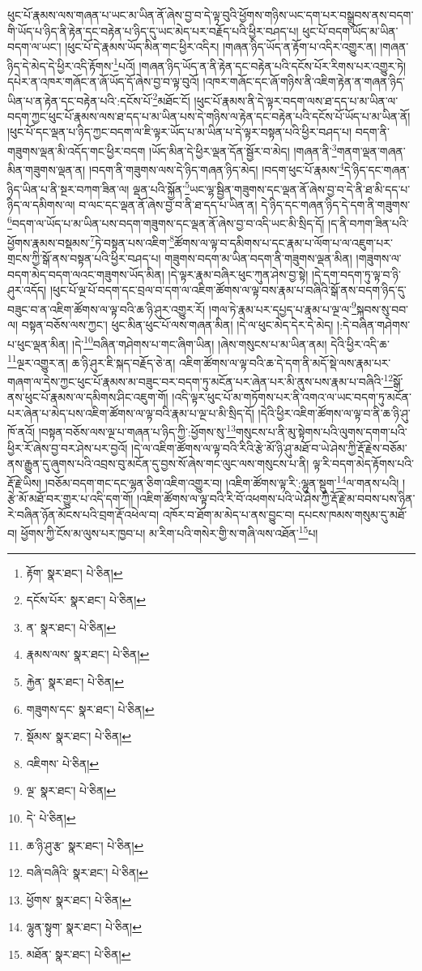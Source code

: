 ཕུང་པོ་རྣམས་ལས་གཞན་པ་ཡང་མ་ཡིན་ནོ་ཞེས་བྱ་བ་དེ་ལྟ་བུའི་ཕྱོགས་གཉིས་ཡང་དག་པར་བསྒྲུབས་ནས་བདག་གི་ཡོད་པ་ཉིད་ནི་རྟེན་དང་བརྟེན་པ་ཉིད་དུ་ཡང་མེད་པར་བརྗོད་པའི་ཕྱིར་བཤད་པ། ཕུང་པོ་བདག་ཡོད་མ་ཡིན་བདག་ལ་ཡང་། །ཕུང་པོ་དེ་རྣམས་ཡོད་མིན་གང་ཕྱིར་འདིར། །གཞན་ཉིད་ཡོད་ན་རྟོག་པ་འདིར་འགྱུར་ན། །གཞན་ཉིད་དེ་མེད་དེ་ཕྱིར་འདི་རྟོགས་\footnote{རྟོག་  སྣར་ཐང་།  པེ་ཅིན། }པའོ། །གཞན་ཉིད་ཡོད་ན་ནི་རྟེན་དང་བརྟེན་པའི་དངོས་པོར་རིགས་པར་འགྱུར་ཏེ། དཔེར་ན་འཁར་གཞོང་ན་ཞོ་ཡོད་དོ་ཞེས་བྱ་བ་ལྟ་བུའོ། །འཁར་གཞོང་དང་ཞོ་གཉིས་ནི་འཇིག་རྟེན་ན་གཞན་ཉིད་ཡིན་པ་ན་རྟེན་དང་བརྟེན་པའི་:དངོས་པོ་\footnote{དངོས་པོར་  སྣར་ཐང་།  པེ་ཅིན། }མཐོང་ངོ། །ཕུང་པོ་རྣམས་ནི་དེ་ལྟར་བདག་ལས་ཐ་དད་པ་མ་ཡིན་ལ་བདག་ཀྱང་ཕུང་པོ་རྣམས་ལས་ཐ་དད་པ་མ་ཡིན་པས་དེ་གཉིས་ལ་རྟེན་དང་བརྟེན་པའི་དངོས་པོ་ཡོད་པ་མ་ཡིན་ནོ། །ཕུང་པོ་དང་ལྡན་པ་ཉིད་ཀྱང་བདག་ལ་ཇི་ལྟར་ཡོད་པ་མ་ཡིན་པ་དེ་ལྟར་བསྟན་པའི་ཕྱིར་བཤད་པ། བདག་ནི་གཟུགས་ལྡན་མི་འདོད་གང་ཕྱིར་བདག །ཡོད་མིན་དེ་ཕྱིར་ལྡན་དོན་སྦྱོར་བ་མེད། །གཞན་ནི་\footnote{ན་  སྣར་ཐང་།  པེ་ཅིན། }གནག་ལྡན་གཞན་མིན་གཟུགས་ལྡན་ན། །བདག་ནི་གཟུགས་ལས་དེ་ཉིད་གཞན་ཉིད་མེད། །བདག་ཕུང་པོ་རྣམས་\footnote{རྣམས་ལས་  སྣར་ཐང་།  པེ་ཅིན། }དེ་ཉིད་དང་གཞན་ཉིད་ཡིན་པ་ནི་སྔར་བཀག་ཟིན་ལ། ལྡན་པའི་སྐྱོན་\footnote{རྐྱེན་  སྣར་ཐང་།  པེ་ཅིན། }ཡང་ལྷ་སྦྱིན་གཟུགས་དང་ལྡན་ནོ་ཞེས་བྱ་བ་དེ་ནི་ཐ་མི་དད་པ་ཉིད་ལ་དམིགས་ལ། བ་ལང་དང་ལྡན་ནོ་ཞེས་བྱ་བ་ནི་ཐ་དད་པ་ཡིན་ན། དེ་ཉིད་དང་གཞན་ཉིད་དེ་དག་ནི་གཟུགས་\footnote{གཟུགས་དང་  སྣར་ཐང་།  པེ་ཅིན། }བདག་ལ་ཡོད་པ་མ་ཡིན་པས་བདག་གཟུགས་དང་ལྡན་ནོ་ཞེས་བྱ་བ་འདི་ཡང་མི་སྲིད་དོ། །ད་ནི་བཀག་ཟིན་པའི་ཕྱོགས་རྣམས་བསྡམས་\footnote{སྡོམས་  སྣར་ཐང་།  པེ་ཅིན། }ཏེ་བསྟན་པས་འཇིག་\footnote{འཇིགས་  པེ་ཅིན། }ཚོགས་ལ་ལྟ་བ་དམིགས་པ་དང་རྣམ་པ་ལོག་པ་ལ་འཇུག་པར་གྲངས་ཀྱི་སྒོ་ནས་བསྟན་པའི་ཕྱིར་བཤད་པ། གཟུགས་བདག་མ་ཡིན་བདག་ནི་གཟུགས་ལྡན་མིན། །གཟུགས་ལ་བདག་མེད་བདག་ལའང་གཟུགས་ཡོད་མིན། །དེ་ལྟར་རྣམ་བཞིར་ཕུང་ཀུན་ཤེས་བྱ་སྟེ། །དེ་དག་བདག་ཏུ་ལྟ་བ་ཉི་ཤུར་འདོད། །ཕུང་པོ་ལྔ་པོ་བདག་དང་བྲལ་བ་དག་ལ་འཇིག་ཚོགས་ལ་ལྟ་བས་རྣམ་པ་བཞིའི་སྒོ་ནས་བདག་ཉིད་དུ་བཟུང་བ་ན་འཇིག་ཚོགས་ལ་ལྟ་བའི་ཆ་ཉི་ཤུར་འགྱུར་རོ། །གལ་ཏེ་རྣམ་པར་དཔྱད་པ་རྣམ་པ་ལྔ་ལ་\footnote{ལྔ་  སྣར་ཐང་།  པེ་ཅིན། }སྐབས་སུ་བབ་ལ། བསྟན་བཅོས་ལས་ཀྱང་། ཕུང་མིན་ཕུང་པོ་ལས་གཞན་མིན། །དེ་ལ་ཕུང་མེད་དེར་དེ་མེད། །:དེ་བཞིན་གཤེགས་པ་ཕུང་ལྡན་མིན། །དེ་\footnote{དེ་  པེ་ཅིན། }བཞིན་གཤེགས་པ་གང་ཞིག་ཡིན། །ཞེས་གསུངས་པ་མ་ཡིན་ནམ། དེའི་ཕྱིར་འདི་ཆ་\footnote{ཆ་ཉི་ཤུ་རྩ་  སྣར་ཐང་།  པེ་ཅིན། }ལྔར་འགྱུར་ན། ཆ་ཉི་ཤུར་ཇི་སྐད་བརྗོད་ཅེ་ན། འཇིག་ཚོགས་ལ་ལྟ་བའི་ཆ་དེ་དག་ནི་མདོ་སྡེ་ལས་རྣམ་པར་གཞག་ལ་དེས་ཀྱང་ཕུང་པོ་རྣམས་མ་བཟུང་བར་བདག་ཏུ་མངོན་པར་ཞེན་པར་མི་ནུས་པས་རྣམ་པ་བཞིའི་\footnote{བཞི་བཞིའི་  སྣར་ཐང་།  པེ་ཅིན། }སྒོ་ནས་ཕུང་པོ་རྣམས་ལ་དམིགས་ཤིང་འཇུག་གོ། །འདི་ལྟར་ཕུང་པོ་མ་གཏོགས་པར་ནི་འགའ་ལ་ཡང་བདག་ཏུ་མངོན་པར་ཞེན་པ་མེད་པས་འཇིག་ཚོགས་ལ་ལྟ་བའི་རྣམ་པ་ལྔ་པ་མི་སྲིད་དོ། །དེའི་ཕྱིར་འཇིག་ཚོགས་ལ་ལྟ་བ་ནི་ཆ་ཉི་ཤུ་ཁོ་ནའོ། །བསྟན་བཅོས་ལས་ལྔ་པ་གཞན་པ་ཉིད་ཀྱི་:ཕྱོགས་སུ་\footnote{ཕྱོགས་  སྣར་ཐང་།  པེ་ཅིན། }གསུངས་པ་ནི་མུ་སྟེགས་པའི་ལུགས་དགག་པའི་ཕྱིར་རོ་ཞེས་བྱ་བར་ཤེས་པར་བྱའོ། །དེ་ལ་འཇིག་ཚོགས་ལ་ལྟ་བའི་རིའི་རྩེ་མོ་ཉི་ཤུ་མཐོ་བ་ཡེ་ཤེས་ཀྱི་རྡོ་རྗེས་བཅོམ་ནས་རྒྱུན་དུ་ཞུགས་པའི་འབྲས་བུ་མངོན་དུ་བྱས་སོ་ཞེས་གང་ལུང་ལས་གསུངས་པ་ནི། ལྟ་རི་བདག་མེད་རྟོགས་པའི་རྡོ་རྗེ་ཡིས། །བཅོམ་བདག་གང་དང་ལྷན་ཅིག་འཇིག་འགྱུར་བ། །འཇིག་ཚོགས་ལྟ་རི་:ལྷུན་སྡུག་\footnote{ལྷུན་སྟུག་  སྣར་ཐང་།  པེ་ཅིན། }ལ་གནས་པའི། །རྩེ་མོ་མཐོ་བར་གྱུར་པ་འདི་དག་གོ། །འཇིག་ཚོགས་ལ་ལྟ་བའི་རི་བོ་འཕགས་པའི་ཡེ་ཤེས་ཀྱི་རྡོ་རྗེ་མ་བབས་པས་ཉིན་རེ་བཞིན་ཉོན་མོངས་པའི་བྲག་རྡོ་འཕེལ་བ། འཁོར་བ་ཐོག་མ་མེད་པ་ནས་བྱུང་བ། དཔངས་ཁམས་གསུམ་དུ་མཐོ་བ། ཕྱོགས་ཀྱི་ངོས་མ་ལུས་པར་ཁྱབ་པ། མ་རིག་པའི་གསེར་གྱི་ས་གཞི་ལས་འཐོན་\footnote{མཐོན་  སྣར་ཐང་།  པེ་ཅིན། }པ། 